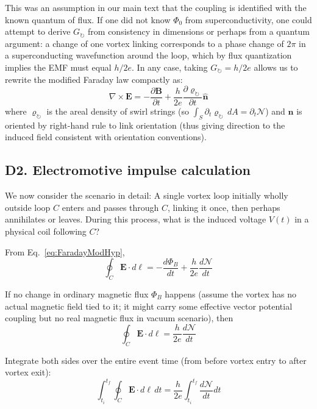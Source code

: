 \documentclass[10pt,reprint,aps,onecolumn,nofootinbib]{revtex4-2}
\begin{document}
This was an assumption in our main text that the coupling is identified with the known quantum of flux. If one did not know $\Phi_0$ from superconductivity, one could attempt to derive $G_{\circlearrowright}$ from consistency in dimensions or perhaps from a quantum argument: a change of one vortex linking corresponds to a phase change of $2\pi$ in a superconducting wavefunction around the loop, which by flux quantization implies the EMF must equal $h/2e$. In any case, taking $G_{\circlearrowright}=h/2e$ allows us to rewrite the modified Faraday law compactly as:
\begin{equation}
\nabla \times \mathbf{E} = -\frac{\partial \mathbf{B}}{\partial t} + \frac{h}{2e} \frac{\partial \varrho_{\circlearrowright}}{\partial t} \hat{\mathbf{n}}
\end{equation}
where $\varrho_{\circlearrowright}$ is the areal density of swirl strings (so $\int_S \partial_t \varrho_{\circlearrowright} \, dA = \partial_t \mathcal{N}$) and $\hat{\mathbf{n}}$ is oriented by right-hand rule to link orientation (thus giving direction to the induced field consistent with orientation conventions).

\subsection*{D2. Electromotive impulse calculation}

We now consider the scenario in detail: A single vortex loop initially wholly outside loop $C$ enters and passes through $C$, linking it once, then perhaps annihilates or leaves. During this process, what is the induced voltage $V(t)$ in a physical coil following $C$?

From Eq.~\eqref{eq:FaradayModHyp},
\begin{equation}
\oint_C \mathbf{E}\cdot d\bm{\ell} = -\frac{d\Phi_B}{dt} + \frac{h}{2e} \frac{d\mathcal{N}}{dt}
\end{equation}

If no change in ordinary magnetic flux $\Phi_B$ happens (assume the vortex has no actual magnetic field tied to it; it might carry some effective vector potential coupling but no real magnetic flux in vacuum scenario), then
\begin{equation}
\oint_C \mathbf{E}\cdot d\bm{\ell} = \frac{h}{2e} \frac{d\mathcal{N}}{dt}
\end{equation}

Integrate both sides over the entire event time (from before vortex entry to after vortex exit):
\begin{equation}
\int_{t_i}^{t_f} \oint_C \mathbf{E}\cdot d\bm{\ell} \, dt = \frac{h}{2e} \int_{t_i}^{t_f} \frac{d\mathcal{N}}{dt} dt
\end{equation}
\end{document}
